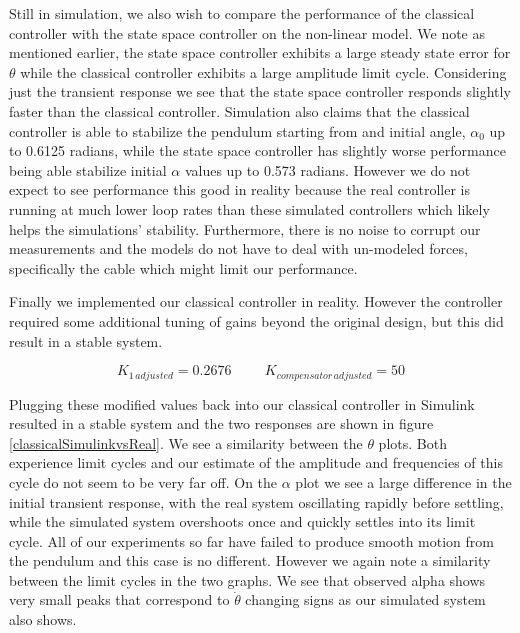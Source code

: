 \documentclass{article}
\theoremstyle{plain}
\theoremstyle{definition}
\theoremstyle{remark}
\begin{document}
Still in simulation, we also wish to compare the performance of the classical controller with the state space controller on the non-linear model.  We note as mentioned earlier, the state space controller exhibits a large steady state error for $\theta$ while the classical controller exhibits a large amplitude limit cycle.  Considering just the transient response we see that the state space controller responds slightly faster than the classical controller.  Simulation also claims that the classical controller is able to stabilize the pendulum starting from and initial angle, $\alpha_0$ up to 0.6125 radians, while the state space controller has slightly worse performance being able stabilize initial $\alpha$ values up to 0.573 radians.  However we do not expect to see performance this good in reality because the real controller is running at much lower loop rates than these simulated controllers which likely helps the simulations' stability.  Furthermore, there is no noise to corrupt our measurements and the models do not have to deal with un-modeled forces, specifically the cable which might limit our performance. 

Finally we implemented our classical controller in reality.  However the controller required some additional tuning of gains beyond the original design, but this did result in a stable system.

$$K_{1 \, adjusted} = 0.2676 \hspace{1cm} K_{compensator \, adjusted} = 50 $$

Plugging these modified values back into our classical controller in Simulink resulted in a stable system and the two responses are shown in figure \ref{classicalSimulinkvsReal}.  We see a similarity between the $\theta$ plots.  Both experience limit cycles and our estimate of the amplitude and frequencies of this cycle do not seem to be very far off.  On the $\alpha$ plot we see a large difference in the initial transient response, with the real system oscillating rapidly before settling, while the simulated system overshoots once and quickly settles into its limit cycle.  All of our experiments so far have failed to produce smooth motion from the pendulum and this case is no different.  However we again note a similarity between the limit cycles in the two graphs.  We see that observed alpha shows very small peaks that correspond to $\dot{\theta}$ changing signs as our simulated system also shows. 
\end{document}
